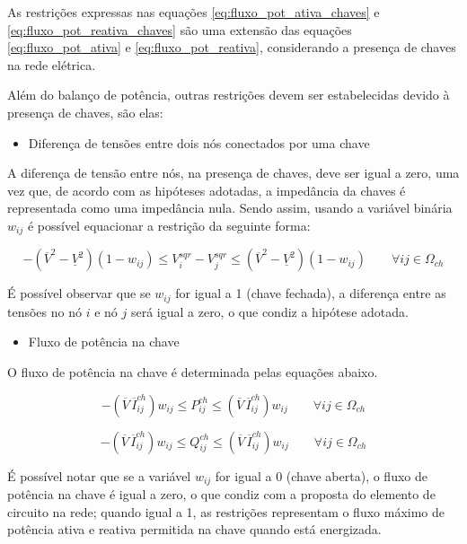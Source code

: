 As restrições expressas nas equações \ref{eq:fluxo_pot_ativa_chaves} e \ref{eq:fluxo_pot_reativa_chaves} são uma extensão das equações \ref{eq:fluxo_pot_ativa} e \ref{eq:fluxo_pot_reativa}, considerando a presença de chaves na rede elétrica.
    
Além do balanço de potência, outras restrições devem ser estabelecidas devido à presença de chaves, são elas:

\begin{itemize}
    \item Diferença de tensões entre dois nós conectados por uma chave
\end{itemize}

    
A diferença de tensão entre nós, na presença de chaves, deve ser igual a zero, uma vez que, de acordo com as hipóteses adotadas, a impedância da chaves é representada como uma impedância nula.
Sendo assim, usando a variável binária $w_{ij}$ é possível equacionar a restrição da seguinte forma:

\begin{equation}
    -(\overline{V}^{2} - \underline{V}^{2})(1-w_{ij}) \leq V_{i}^{sqr} - V_{j}^{sqr} \leq (\overline{V}^{2} - \underline{V}^{2})(1-w_{ij})\qquad\forall ij\in\Omega_{ch}        
\end{equation}
    
É possível observar que se $w_{ij}$ for igual a 1 (chave fechada), a diferença entre as tensões no nó $i$ e nó $j$ será igual a zero, o que condiz a hipótese adotada.

\begin{itemize}
   \item Fluxo de potência na chave
\end{itemize} 
    
O fluxo de potência na chave é determinada pelas equações abaixo.
    
\begin{equation}
    -(\overline{V}\,\overline{I}_{ij}^{ch})w_{ij} \leq P_{ij}^{ch} \leq (\overline{V}\,\overline{I}_{ij}^{ch})w_{ij}\qquad\forall ij\in\Omega_{ch}   
\end{equation}
    
    
\begin{equation}
    -(\overline{V}\,\overline{I}_{ij}^{ch})w_{ij} \leq Q_{ij}^{ch} \leq (\overline{V}\,\overline{I}_{ij}^{ch})w_{ij}\qquad\forall ij\in\Omega_{ch}   
\end{equation}
    
É possível notar que se a variável $w_{ij}$ for igual a 0 (chave aberta), o fluxo de potência na chave é igual a zero, o que condiz com a proposta do elemento de circuito na rede; quando igual a 1, as restrições representam o fluxo máximo de potência ativa e reativa permitida na chave quando está energizada.

